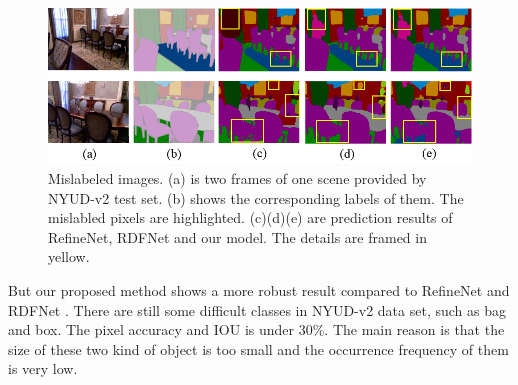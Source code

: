 \begin{figure}[!htbp]
	\setlength{\abovecaptionskip}{-0.2cm}
	\setlength{\belowcaptionskip}{-10cm}
	\centering
	\includegraphics[scale=0.4]{figure/Mislabels.png}
	\caption{Mislabeled images. (a) is two frames of one scene provided by NYUD-v2 test set. (b) shows the corresponding labels of them. The mislabled pixels are highlighted. (c)(d)(e) are prediction results of RefineNet, RDFNet and our model. The details are framed in yellow.}
	\label{fig:mislabels}
\end{figure}
%
But our proposed method shows a more robust result compared to RefineNet \cite{Lin2017} and RDFNet \cite{Park2017}.
%
There are still some difficult classes in NYUD-v2 data set, such as bag and box.
%
The pixel accuracy and IOU is under 30\%.
%
The main reason is that the size of these two kind of object is too small and the occurrence frequency of them is very low. 






